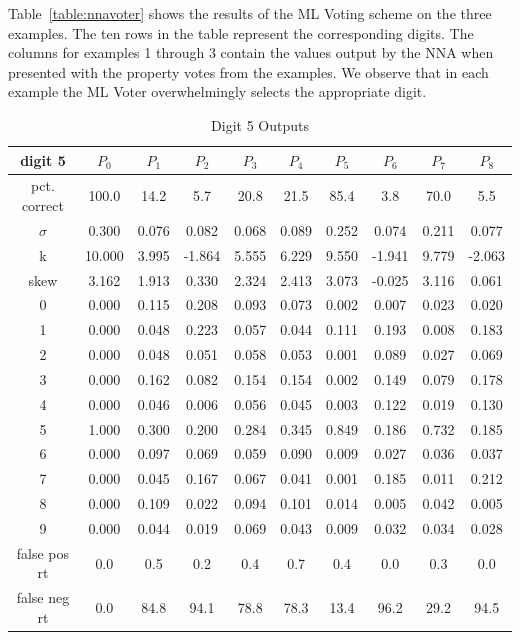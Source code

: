\documentclass[conference]{IEEEtran}
\begin{document}
Table~\ref{table:nnavoter} shows the results of the ML Voting scheme on the three examples.  The ten rows in the table represent the corresponding digits.  The columns for examples 1 through 3 contain the values output by the NNA when presented with the property votes from the examples.  We observe that in each example the ML Voter overwhelmingly selects the appropriate digit.

\begin{table}
\caption{Digit 5 Outputs}
\centering
\begin{tabular}{ | c ||  c | c | c | c | c | c | c | c | c |}
 digit 5 & $P_0$ & $P_1$ & $P_2$ & $P_3$ & $P_4$ & $P_5$ & $P_6$ & $P_7$ & $P_8$ \\
\hline \hline
pct. correct  & 100.0 & 14.2 & 5.7 & 20.8 & 21.5 & 85.4 & 3.8 & 70.0 & 5.5 \\
\hline
$\sigma$ & 0.300& 0.076& 0.082& 0.068& 0.089& 0.252& 0.074& 0.211& 0.077 \\
\hline
k & 10.000& 3.995& -1.864& 5.555& 6.229& 9.550& -1.941& 9.779& -2.063 \\
\hline
skew & 3.162& 1.913& 0.330& 2.324& 2.413& 3.073& -0.025& 3.116& 0.061 \\
\hline
0 & 0.000 & 0.115 & 0.208 & 0.093 & 0.073 & 0.002 & 0.007 & 0.023 & 0.020 \\
\hline
1 & 0.000 & 0.048 & 0.223 & 0.057 & 0.044 & 0.111 & 0.193 & 0.008 & 0.183 \\
\hline
2 & 0.000 & 0.048 & 0.051 & 0.058 & 0.053 & 0.001 & 0.089 & 0.027 & 0.069 \\
\hline
3 & 0.000 & 0.162 & 0.082 & 0.154 & 0.154 & 0.002 & 0.149 & 0.079 & 0.178 \\
\hline
4 & 0.000 & 0.046 & 0.006 & 0.056 & 0.045 & 0.003 & 0.122 & 0.019 & 0.130 \\
\hline
5 & 1.000 & 0.300 & 0.200 & 0.284 & 0.345 & 0.849 & 0.186 & 0.732 & 0.185 \\
\hline
6 & 0.000 & 0.097 & 0.069 & 0.059 & 0.090 & 0.009 & 0.027 & 0.036 & 0.037 \\
\hline
7 & 0.000 & 0.045 & 0.167 & 0.067 & 0.041 & 0.001 & 0.185 & 0.011 & 0.212 \\
\hline
8 & 0.000 & 0.109 & 0.022 & 0.094 & 0.101 & 0.014 & 0.005 & 0.042 & 0.005 \\
\hline
9 & 0.000 & 0.044 & 0.019 & 0.069 & 0.043 & 0.009 & 0.032 & 0.034 & 0.028 \\
\hline
false pos rt & 0.0 & 0.5 & 0.2 & 0.4 & 0.7 & 0.4 & 0.0 & 0.3 & 0.0 \\
\hline
false neg rt & 0.0 & 84.8 & 94.1 & 78.8 & 78.3 & 13.4 & 96.2 & 29.2 & 94.5 \\
\hline
\end{tabular}
\label{table:digit5out}
\end{table}
\end{document}
